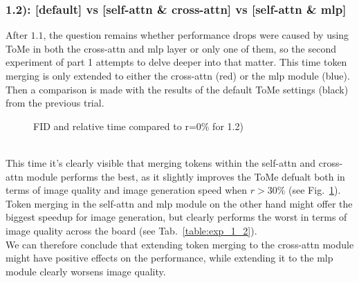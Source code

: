 \subsubsection*{1.2): [default] vs [self-attn \& cross-attn] vs [self-attn \& mlp]}
After \(1.1\), the question remains whether performance drops were caused by using ToMe in both the cross-attn and mlp layer or only one of them, so the second experiment of part 1 attempts to delve deeper into that matter. This time token merging is only extended to either the cross-attn (red) or the mlp module (blue). Then a comparison is made with the results of the default ToMe settings (black) from the previous trial.
\begin{figure}[!htb]
    
    
\caption{FID and relative time compared to r=0\% for 1.2)}
\label{fig:exp_1_2}
\end{figure}\\
This time it's clearly visible that merging tokens within the self-attn and cross-attn module performs the best, as it slightly improves the ToMe defualt both in terms of image quality and image generation speed when \(r > 30\%\) (see Fig.~\ref{fig:exp_1_2}).\\
Token merging in the self-attn and mlp module on the other hand might offer the biggest speedup for image generation, but clearly performs the worst in terms of image quality across the board (see Tab.~\ref{table:exp_1_2}).\\
We can therefore conclude that extending token merging to the cross-attn module might have positive effects on the performance, while extending it to the mlp module clearly worsens image quality.



